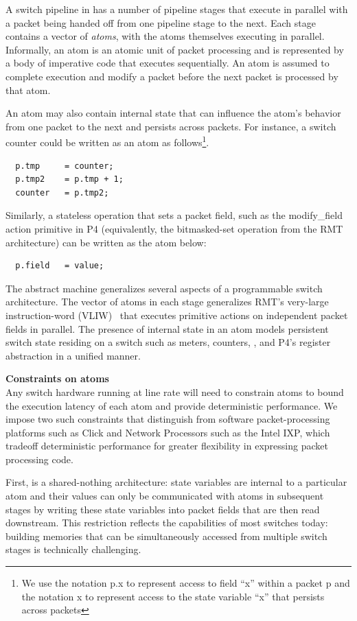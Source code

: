 A switch pipeline in \absmachine has a number of pipeline stages that execute
in parallel with a packet being handed off from one pipeline stage to the next.
Each stage contains a vector of \textit{atoms}, with the atoms themselves
executing in parallel. Informally, an atom is an atomic unit of packet
processing and is represented by a body of imperative code that executes
sequentially. An atom is assumed to complete execution and modify a packet
before the next packet is processed by that atom.

An atom may also contain internal state that can influence the atom's behavior
from one packet to the next and persists across packets. For instance, a switch
counter could be written as an atom as follows\footnote{We use the notation p.x
to represent access to field ``x'' within a packet p and the notation x to
represent access to the state variable ``x'' that persists across packets}.
\begin{verbatim}
  p.tmp     = counter;
  p.tmp2    = p.tmp + 1;
  counter   = p.tmp2;
\end{verbatim}
Similarly, a stateless operation that sets a packet field, such as the
modify\_field action primitive in P4 (equivalently, the bitmasked-set operation
from the RMT architecture) can be written as the atom below:
\begin{verbatim}
  p.field   = value;
\end{verbatim}

The \absmachine abstract machine generalizes several aspects of a programmable
switch architecture. The vector of atoms in each stage generalizes RMT's
very-large instruction-word (VLIW)~\cite{rmt} that executes primitive actions
on independent packet fields in parallel. The presence of internal state in an
atom models persistent switch state residing on a switch such as meters,
counters, , and P4's register abstraction in a unified manner.

\textbf{Constraints on atoms} \\

Any switch hardware running at line rate will need to constrain atoms to bound
the execution latency of each atom and provide deterministic performance. We
impose two such constraints that distinguish \absmachine from software
packet-processing platforms such as Click and Network Processors such as the
Intel IXP, which tradeoff deterministic performance for greater flexibility in
expressing packet processing code.

First, \absmachine is a shared-nothing architecture: state variables are internal to
a particular atom and their values can only be communicated with atoms in
subsequent stages by writing these state variables into packet fields that are
then read downstream.  This restriction reflects the capabilities of most
switches today: building memories that can be simultaneously accessed from
multiple switch stages is technically challenging.

